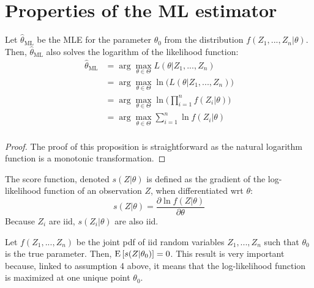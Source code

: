 \section{Properties of the ML estimator}

\begin{proposition}
Let $\hat \theta_{\text{ML}}$ be the MLE for the parameter $\theta_0$ from the distribution $f(Z_1,...,Z_n\vert\theta)$. Then, $\hat \theta_{\text{ML}}$ also solves the logarithm of the likelihood function:\begin{align*}
\hat \theta_{\text{ML}} & = \operatorname{arg}\max_{\theta \in \Theta} L(\theta\vert Z_1, ..., Z_n) \\
& = \operatorname{arg}\max_{\theta \in \Theta} \ln\big(L(\theta\vert Z_1, ..., Z_n)\big) \\
& = \operatorname{arg}\max_{\theta \in \Theta} \ln\big(\prod_{i=1}^{n} f(Z_i\vert \theta)\big) \\
& = \operatorname{arg}\max_{\theta \in \Theta}\sum_{i=1}^{n} \ln f(Z_i\vert \theta) \\
\end{align*}
\end{proposition}
\begin{proof}
The proof of this proposition is straightforward as the natural logarithm function is a monotonic transformation.
\end{proof}

\begin{definition}
The score function, denoted $s(Z\vert\theta)$ is defined as the gradient of the log-likelihood function of an observation $Z$, when differentiated wrt $\theta$:$$ s(Z\vert\theta) = \frac{\partial \ln f(Z\vert \theta)}{\partial \theta} $$Because $Z_i$ are iid, $s(Z_i\vert\theta)$ are also iid.
\end{definition}

\begin{proposition}
Let $f(Z_1, ..., Z_n)$ be the joint pdf of iid random variables $Z_1, ..., Z_n$ such that $\theta_0$ is the true parameter. Then, $\operatorname{E}\left[s(Z\vert\theta_0)\right]=0$. This result is very important because, linked to assumption 4 above, it means that the log-likelihood function is maximized at one unique point $\theta_0$.
\end{proposition}

